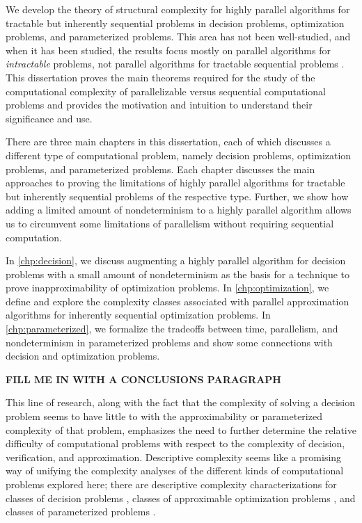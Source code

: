 %
%
%
We develop the theory of structural complexity for highly parallel algorithms for tractable but inherently sequential problems in decision problems, optimization problems, and parameterized problems.
This area has not been well-studied, and when it has been studied, the results focus mostly on parallel algorithms for \emph{intractable} problems, %
not parallel algorithms for tractable sequential problems %
.
%
%
%
This dissertation proves the main theorems required for the study of the computational complexity of parallelizable versus sequential computational problems and provides the motivation and intuition to understand their significance and use.

%
%
%
%
There are three main chapters in this dissertation, each of which discusses a different type of computational problem, namely decision problems, optimization problems, and parameterized problems.
Each chapter discusses the main approaches to proving the limitations of highly parallel algorithms for tractable but inherently sequential problems of the respective type.
Further, we show how adding a limited amount of nondeterminism to a highly parallel algorithm allows us to circumvent some limitations of parallelism without requiring sequential computation.

In \autoref{chp:decision}, we discuss augmenting a highly parallel algorithm for decision problems with a small amount of nondeterminism as the basis for a technique to prove inapproximability of optimization problems.
In \autoref{chp:optimization}, we define and explore the complexity classes associated with parallel approximation algorithms for inherently sequential optimization problems.
In \autoref{chp:parameterized}, we formalize the tradeoffs between time, parallelism, and nondeterminism in parameterized problems and show some connections with decision and optimization problems.

%
%
%
\textbf{FILL ME IN WITH A CONCLUSIONS PARAGRAPH}

%
%
This line of research, along with the fact that the complexity of solving a decision problem seems to have little to with the approximability or parameterized complexity of that problem, emphasizes the need to further determine the relative difficulty of computational problems with respect to the complexity of decision, verification, and approximation.
Descriptive complexity seems like a promising way of unifying the complexity analyses of the different kinds of computational problems explored here; there are descriptive complexity characterizations for classes of decision problems \autocite{immerman99}, classes of approximable optimization problems \autocite{kt93}, and classes of parameterized problems \autocite{fg06}.


